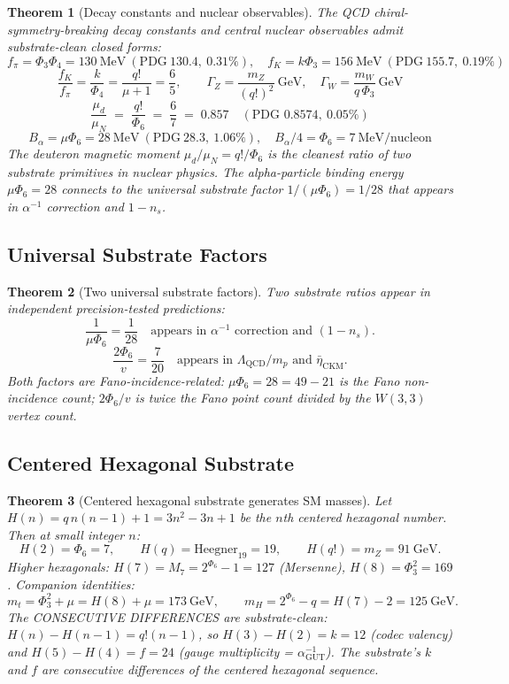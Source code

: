 \documentclass[11pt]{article}
\newtheorem{theorem}{Theorem}[section]
\begin{document}
\begin{theorem}[Decay constants and nuclear observables]\label{thm:decay_nuclear}
The QCD chiral-symmetry-breaking decay constants and central nuclear
observables admit substrate-clean closed forms:
\[
  f_\pi = \Phi_3\Phi_4 = 130~\mathrm{MeV}\ (\text{PDG}\ 130.4,\ 0.31\%), \quad
  f_K  = k\Phi_3 = 156~\mathrm{MeV}\ (\text{PDG}\ 155.7,\ 0.19\%)
\]
\[
  \frac{f_K}{f_\pi} = \frac{k}{\Phi_4} = \frac{q!}{\mu+1} = \frac{6}{5}, \qquad
  \Gamma_Z = \frac{m_Z}{(q!)^2}~\mathrm{GeV},\quad
  \Gamma_W = \frac{m_W}{q\,\Phi_3}~\mathrm{GeV}
\]
\[
  \frac{\mu_d}{\mu_N} \;=\; \frac{q!}{\Phi_6} \;=\; \frac{6}{7} \;=\; 0.857
  \quad (\text{PDG } 0.8574,\ 0.05\%)
\]
\[
  B_\alpha = \mu\Phi_6 = 28~\mathrm{MeV}\ (\text{PDG}\ 28.3,\ 1.06\%), \quad
  B_\alpha / 4 = \Phi_6 = 7~\mathrm{MeV}/\text{nucleon}
\]
The deuteron magnetic moment $\mu_d/\mu_N = q!/\Phi_6$ is the cleanest
ratio of two substrate primitives in nuclear physics.  The alpha-particle
binding energy $\mu\Phi_6 = 28$ connects to the universal substrate
factor $1/(\mu\Phi_6) = 1/28$ that appears in $\alpha^{-1}$ correction
and $1-n_s$.
\end{theorem}

\subsection{Universal Substrate Factors}

\begin{theorem}[Two universal substrate factors]\label{thm:universal_factors}
Two substrate ratios appear in independent precision-tested predictions:
\[
  \frac{1}{\mu \Phi_6} = \frac{1}{28} \quad \text{appears in } \alpha^{-1} \text{ correction and } (1 - n_s).
\]
\[
  \frac{2 \Phi_6}{v} = \frac{7}{20} \quad \text{appears in } \Lambda_{\mathrm{QCD}}/m_p \text{ and } \bar\eta_{\mathrm{CKM}}.
\]
Both factors are Fano-incidence-related: $\mu\Phi_6 = 28 = 49 - 21$
is the Fano non-incidence count; $2\Phi_6/v$ is twice the Fano point
count divided by the $W(3,3)$ vertex count.
\end{theorem}

\subsection{Centered Hexagonal Substrate}

\begin{theorem}[Centered hexagonal substrate generates SM masses]\label{thm:hex_substrate}
Let $H(n) = q\,n(n-1) + 1 = 3n^2 - 3n + 1$ be the $n$th centered
hexagonal number.  Then at small integer $n$:
\[
  H(2)  = \Phi_6 = 7, \qquad
  H(q)  = \mathrm{Heegner}_{19} = 19, \qquad
  H(q!) = m_Z = 91~\mathrm{GeV}.
\]
Higher hexagonals: $H(7) = M_7 = 2^{\Phi_6}-1 = 127$ (Mersenne),
$H(8) = \Phi_3^2 = 169$.  Companion identities:
\[
  m_t = \Phi_3^2 + \mu = H(8) + \mu = 173~\mathrm{GeV}, \qquad
  m_H = 2^{\Phi_6} - q = H(7) - 2 = 125~\mathrm{GeV}.
\]
The CONSECUTIVE DIFFERENCES are substrate-clean: $H(n)-H(n-1) = q!(n-1)$,
so $H(3)-H(2) = k = 12$ (codec valency) and $H(5)-H(4) = f = 24$
(gauge multiplicity = $\alpha^{-1}_{\mathrm{GUT}}$).  The substrate's
$k$ and $f$ are consecutive differences of the centered hexagonal
sequence.
\end{theorem}
\end{document}
